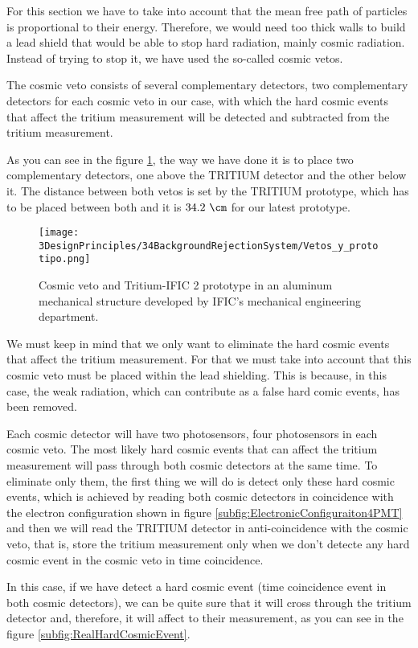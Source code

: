For this section we have to take into account that the mean free path of particles is proportional to their energy. Therefore, we would need too thick walls to build a lead shield that would be able to stop hard radiation, mainly cosmic radiation. Instead of trying to stop it, we have used the so-called cosmic vetos.

The cosmic veto consists of several complementary detectors, two complementary detectors for each cosmic veto in our case, with which the hard cosmic events that affect the tritium measurement will be detected and subtracted from the tritium measurement.

As you can see in the figure \ref{fig:VetoAndPrototype}, the way we have done it is to place two complementary detectors, one above the TRITIUM detector and the other below it. The distance between both vetos is set by the TRITIUM prototype, which has to be placed between both and it is $34.2~\cm$ for our latest prototype.

\begin{figure}[h]
\centering
\texttt{[image: 3DesignPrinciples/34BackgroundRejectionSystem/Vetos\_y\_prototipo.png]}
\caption{Cosmic veto and Tritium-IFIC 2 prototype in an aluminum mechanical structure developed by IFIC's mechanical engineering department.\label{fig:VetoAndPrototype}}
\end{figure}

We must keep in mind that we only want to eliminate the hard cosmic events that affect the tritium measurement. For that we must take into account that this cosmic veto must be placed within the lead shielding. This is because, in this case, the weak radiation, which can contribute as a false hard comic events, has been removed.

Each cosmic detector will have two photosensors, four photosensors in each cosmic veto. The most likely hard cosmic events that can affect the tritium measurement will pass through both cosmic detectors at the same time. To eliminate only them, the first thing we will do is detect only these hard cosmic events, which is achieved by reading both cosmic detectors in coincidence with the electron configuration shown in figure \ref{subfig:ElectronicConfiguraiton4PMT} and then we will read the TRITIUM detector in anti-coincidence with the cosmic veto, that is, store the tritium measurement only when we don't detecte any hard cosmic event in the cosmic veto in time coincidence. 

In this case, if we have detect a hard cosmic event (time coincidence event in both cosmic detectors), we can be quite sure that it will cross through the tritium detector and, therefore, it will affect to their measurement, as you can see in the figure \ref{subfig:RealHardCosmicEvent}.

